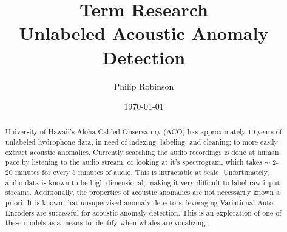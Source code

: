 \documentclass{article}
\title{Term Research \\ Unlabeled Acoustic Anomaly Detection}
\date{\today}
\author{Philip Robinson}
\affil{Oregon Health Sciences University}
\begin{document}
\maketitle

\def\aa{acoustic anomalies\xspace}
\def\ae{Auto-Encoders\xspace}
\def\vae{Variational \ae\xspace}
\def\gumiho{Gumiho Network\xspace}
\def\condgen{Conditional Generating Network\xspace}
\def\desc{Descriminator Network\xspace}

\def\np{Neyman-Pearson Lemma\xspace}
\def\pdf{probability density function\xspace}
\def\fpr{false positive rate\xspace}
\def\tfpr{true/false positive rate\xspace}
\def\tpr{true positive rate\xspace}
\def\keras{\texttt{keras}\xspace}
\def\pytorch{\texttt{pytorch}\cite{paszke2017automatic}\xspace}
\def\tensorflow{\texttt{tensorflow}\xspace}
\def\ray{\texttt{ray}\xspace}

\def\encoder{\texttt{encoder}\xspace}
\def\decoder{\texttt{decoder}\xspace}
\def\bottle{\texttt{bottle}\xspace}
\def\GMM{\texttt{GMM}\xspace}



\begin{abstract}
University of Hawaii's Aloha Cabled Observatory (ACO) has approximately 10 years
of unlabeled hydrophone data, in need of indexing, labeling, and cleaning; to more
easily extract \aa.
Currently searching the audio recordings is done at human pace by listening
to the audio stream, or looking at it's spectrogram, which takes $\sim$ 2-20 minutes
for every 5 minutes of audio. This is intractable at scale.
Unfortunately, audio data is known to be high dimensional, making it
very difficult to label raw input streams. Additionally, the properties of
\aa are not necessarily known a priori. It is known that unsupervised anomaly detectors,
leveraging \vae are successful for acoustic anomaly detection\cite{Koizumi:2019:UDA:3282584.3301702}.
This is an exploration of one of these models as a means to identify when whales
are vocalizing.

\end{abstract}
\end{document}
